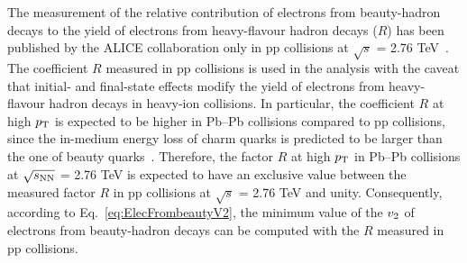 \documentclass[11pt,a4paper]{article}
\providecommand{\vtwo}{$v_{\rm 2}$ }
\providecommand{\s}{$\sqrt{s}$ }
\providecommand{\snn}{$\sqrt{s_{\rm NN}}$ }
\begin{document}
The measurement of the relative contribution of electrons from beauty-hadron decays to the yield of electrons from heavy-flavour hadron decays ($R$) has been published by the ALICE collaboration only in pp collisions at \s = 2.76 TeV~\cite{Abelev:2014hla,2016507}.
The coefficient $R$ measured in pp collisions is used in the analysis with the caveat that initial- and final-state effects modify the yield of electrons from heavy-flavour hadron decays in heavy-ion collisions. In particular, the coefficient $R$ at high $p_{\rm T}$ is expected to be higher in Pb--Pb collisions compared to pp collisions, since the in-medium energy loss of charm quarks is predicted to be larger than the one of beauty quarks~\cite{Adam:2016wyz}. 
Therefore, the factor $R$ at high $p_{\rm T}$  in Pb--Pb collisions at \snn = 2.76 TeV is expected to have an exclusive value between  the measured factor $R$ in pp collisions at \s = 2.76 TeV and unity. Consequently, according to Eq.~\ref{eq:ElecFrombeautyV2}, 
the minimum value of the  \vtwo of electrons from beauty-hadron decays can be computed with the $R$ measured in pp collisions.
\end{document}
